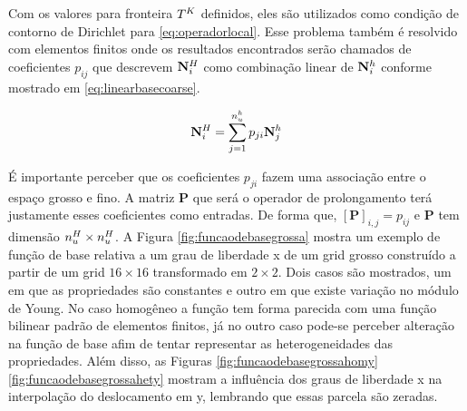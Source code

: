 Com os valores para  fronteira $\coarseelement$  definidos, eles são utilizados como condição de contorno de Dirichlet para \eqref{eq:operadorlocal}. Esse problema também é resolvido com elementos finitos onde os resultados encontrados serão chamados de coeficientes $p_{ij}$ que descrevem $\basefunctioncoarse$ como combinação linear de $\basefunctionfine$ conforme mostrado em \eqref{eq:linearbasecoarse}. 


\begin{equation} \label{eq:linearbasecoarse}
    \basefunctioncoarse = \sum_{j=1}^{\qtdfreedomfine} p_{ji} \basefunctionfine[j]
\end{equation}


É importante perceber que os coeficientes $p_{ji}$ fazem uma associação entre o espaço grosso e fino. A matriz $\mathbf{P}$ que será o operador de prolongamento terá justamente esses coeficientes como entradas. De forma que, $[\mathbf{P}]_{i,j} = p_{ij}$ e $\mathbf{P}$ tem dimensão $\qtdfreedomcoarse \times \qtdfreedomcoarse$. A Figura \ref{fig:funcaodebasegrossa} mostra um exemplo de função de base relativa a um grau de liberdade x de um grid grosso construído a partir de um grid $16\times16$ transformado em  $2\times2$. Dois casos são mostrados, um em que as propriedades são constantes e outro em que existe variação no módulo de Young. No caso homogêneo a função tem forma parecida com uma função bilinear padrão de elementos finitos, já no outro caso pode-se perceber alteração na função de base afim de tentar representar as heterogeneidades das propriedades. Além disso, as Figuras \ref{fig:funcaodebasegrossahomy} \ref{fig:funcaodebasegrossahety} mostram a influência dos graus de liberdade x na interpolação do deslocamento em y, lembrando que essas parcela são zeradas. 



